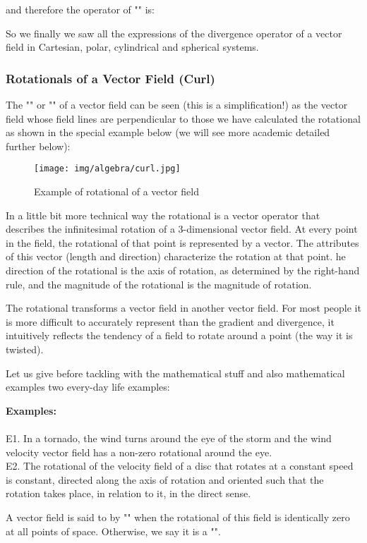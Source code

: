 	and therefore the operator of "" is:
	
	So we finally we saw all the expressions of the divergence operator of a vector field in Cartesian, polar, cylindrical and spherical systems.
	
	\pagebreak
	\subsubsection{Rotationals of a Vector Field (Curl)}
	The "" or "" of a vector field can be seen (this is a simplification!) as the vector field whose field lines are perpendicular to those we have calculated the rotational as shown in the special example below (we will see more academic detailed further below):
	\begin{figure}[H]
	\centering
		\texttt{[image: img/algebra/curl.jpg]}
		\caption{Example of rotational of a vector field}
	\end{figure}
	In a little bit more technical way the rotational is a vector operator that describes the infinitesimal rotation of a $3$-dimensional vector field. At every point in the field, the rotational of that point is represented by a vector. The attributes of this vector (length and direction) characterize the rotation at that point. he direction of the rotational is the axis of rotation, as determined by the right-hand rule, and the magnitude of the rotational is the magnitude of rotation. 
	
	The rotational transforms a vector field in another vector field. For most people it is more difficult to accurately represent than the gradient and divergence, it intuitively reflects the tendency of a field to rotate around a point (the way it is twisted).
	
	Let us give before tackling with the mathematical stuff and also mathematical examples two every-day life examples:
	\begin{tcolorbox}[colframe=black,colback=white,sharp corners]
	\textbf{{\Large {}}Examples:}\\\\
	E1. In a tornado, the wind turns around the eye of the storm and the wind velocity vector field has a non-zero rotational around the eye.\\

	E2. The rotational of the velocity field of a disc that rotates at a constant speed is constant, directed along the axis of rotation and oriented such that the rotation takes place, in relation to it, in the direct sense.\\
	\end{tcolorbox}
	A vector field is said to by "" when the rotational of this field is identically zero at all points of space. Otherwise, we say it is a "".
	
